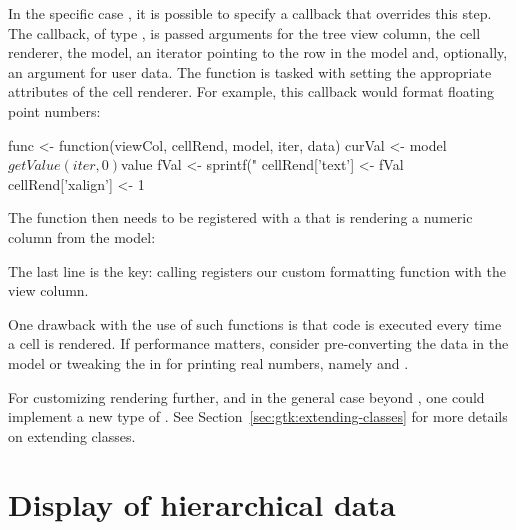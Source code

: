In the specific case , it is possible to specify a
callback that overrides this step.  The callback, of type
, is passed arguments for the tree view
column, the cell renderer, the model, an iterator pointing to the row
in the model and, optionally, an argument for user data. The function
is tasked with setting the appropriate attributes of the cell
renderer. For example, this callback would format floating point
numbers:
\begin{Schunk}
\begin{Sinput}
 func <- function(viewCol, cellRend, model, iter, data) {
   curVal <- model$getValue(iter, 0)$value
   fVal <- sprintf("%
   cellRend['text'] <- fVal
   cellRend['xalign'] <- 1
 }
\end{Sinput}
\end{Schunk}
%
The function then needs to be registered with a
 that is rendering a numeric column from the model:
\begin{Schunk}
\end{Schunk}
%
The last line is the key: calling
 registers our custom
formatting function with the view column.

One drawback with the use of such functions is that \R\/ code is
executed every time a cell is rendered. If performance matters,
consider pre-converting the data in the model or tweaking the
 in \R\/ for printing real numbers, namely 
and .

For customizing rendering further, and in the general case beyond
, one could implement a new type of
.  See Section~\ref{sec:gtk:extending-classes}
for more details on extending \GTK\/ classes.


\section{Display of hierarchical data}
\label{sec:RGtk2:mvc:GtkTreeStore}

